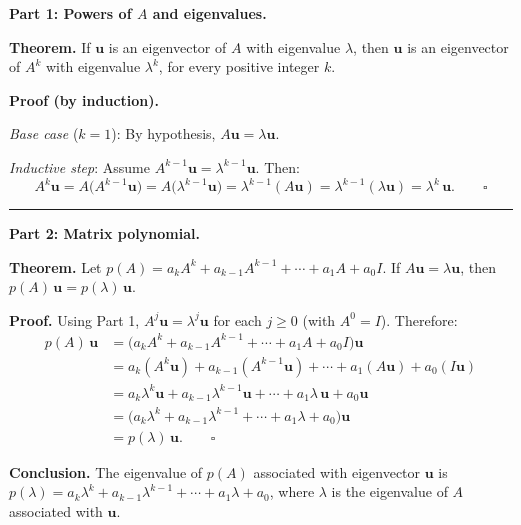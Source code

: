 \documentclass[12pt,a3paper]{article}
\begin{document}
\begin{tcolorbox}[enhanced,breakable,
  colback=cE!4,colframe=cE,boxrule=0.8pt,arc=5pt,
  title={\textbf{Answer --- Eigenvalue of a Matrix Polynomial}},
  fonttitle=\bfseries\color{white},colbacktitle=cE]

\textbf{Part 1: Powers of $A$ and eigenvalues.}

\textbf{Theorem.} If $\mathbf{u}$ is an eigenvector of $A$ with eigenvalue $\lambda$,
then $\mathbf{u}$ is an eigenvector of $A^k$ with eigenvalue $\lambda^k$,
for every positive integer $k$.

\textbf{Proof (by induction).}

\textit{Base case} ($k=1$): By hypothesis, $A\mathbf{u} = \lambda\mathbf{u}$. \checkmark

\textit{Inductive step}: Assume $A^{k-1}\mathbf{u} = \lambda^{k-1}\mathbf{u}$.  Then:
\[
  A^k \mathbf{u} = A\bigl(A^{k-1}\mathbf{u}\bigr)
                = A\bigl(\lambda^{k-1}\mathbf{u}\bigr)
                = \lambda^{k-1}(A\mathbf{u})
                = \lambda^{k-1}(\lambda\mathbf{u})
                = \lambda^k\,\mathbf{u}. \qquad\square
\]

\medskip\textcolor{cE}{\rule{\textwidth}{0.4pt}}

\textbf{Part 2: Matrix polynomial.}

\textbf{Theorem.} Let $p(A) = a_k A^k + a_{k-1}A^{k-1} + \cdots + a_1 A + a_0 I$.
If $A\mathbf{u} = \lambda\mathbf{u}$, then $p(A)\,\mathbf{u} = p(\lambda)\,\mathbf{u}$.

\textbf{Proof.} Using Part 1, $A^j \mathbf{u} = \lambda^j \mathbf{u}$ for each $j \geq 0$ (with $A^0 = I$).
Therefore:
\begin{align*}
  p(A)\,\mathbf{u}
  &= \bigl(a_k A^k + a_{k-1}A^{k-1} + \cdots + a_1 A + a_0 I\bigr)\mathbf{u} \\
  &= a_k(A^k\mathbf{u}) + a_{k-1}(A^{k-1}\mathbf{u}) + \cdots + a_1(A\mathbf{u}) + a_0(I\mathbf{u}) \\
  &= a_k\lambda^k\mathbf{u} + a_{k-1}\lambda^{k-1}\mathbf{u} + \cdots + a_1\lambda\,\mathbf{u} + a_0\mathbf{u} \\
  &= \bigl(a_k\lambda^k + a_{k-1}\lambda^{k-1} + \cdots + a_1\lambda + a_0\bigr)\mathbf{u} \\
  &= p(\lambda)\,\mathbf{u}. \qquad\square
\end{align*}

\textbf{Conclusion.} The eigenvalue of $p(A)$ associated with eigenvector $\mathbf{u}$
is $p(\lambda) = a_k\lambda^k + a_{k-1}\lambda^{k-1} + \cdots + a_1\lambda + a_0$,
where $\lambda$ is the eigenvalue of $A$ associated with $\mathbf{u}$.

\end{tcolorbox}
\end{document}
